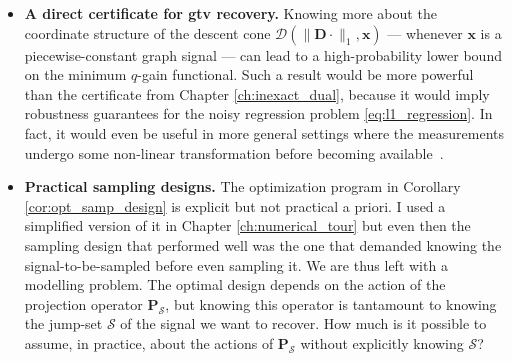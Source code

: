 \begin{itemize}
    \item \textbf{A direct certificate for \acrshort{gtv} recovery.} Knowing more about the coordinate structure of the descent cone $\mathcal{D} \left ( \|\mathbf{D} \cdot\|_1 , \mathbf{x} \right )$ --- whenever $\mathbf{x}$ is a piecewise-constant graph signal --- can lead to a high-probability lower bound on the minimum $q$-gain functional. Such a result would be more powerful than the certificate from Chapter \ref{ch:inexact_dual}, because it would imply robustness guarantees for the noisy regression problem \eqref{eq:l1_regression}. In fact, it would even be useful in more general settings where the measurements undergo some non-linear transformation before becoming available~\cite{plan2016}.
    \item \textbf{Practical sampling designs.} The optimization program in Corollary \ref{cor:opt_samp_design} is explicit but not practical a priori. I used a simplified version of it in Chapter \ref{ch:numerical_tour} but even then the sampling design that performed well was the one that demanded knowing the signal-to-be-sampled before even sampling it. We are thus left with a modelling problem. The optimal design depends on the action of the projection operator $\mathbf{P}_{\mathcal{S}}$, but knowing this operator is tantamount to knowing the jump-set $\mathcal{S}$ of the signal we want to recover. How much is it possible to assume, in practice, about the actions of $\mathbf{P}_{\mathcal{S}}$ without explicitly knowing $\mathcal{S}$?
\end{itemize}
